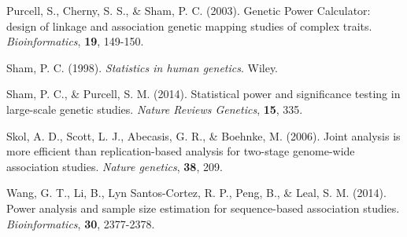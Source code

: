 \documentclass{bioinfo}
\begin{document}
\begin{thebibliography}{}
Purcell, S., Cherny, S. S., \& Sham, P. C. (2003). 
Genetic Power Calculator: design of linkage and association genetic mapping studies of complex traits. 
{\it Bioinformatics}, {\bf 19}, 149-150.

Sham, P. C. (1998). {\it Statistics in human genetics}. Wiley.

Sham, P. C., \& Purcell, S. M. (2014).
Statistical power and significance testing in large-scale genetic studies. 
{\it Nature Reviews Genetics}, {\bf 15}, 335.

Skol, A. D., Scott, L. J., Abecasis, G. R., \& Boehnke, M. (2006). 
Joint analysis is more efficient than replication-based analysis for two-stage genome-wide association studies. 
{\it Nature genetics}, {\bf 38}, 209.

Wang, G. T., Li, B., Lyn Santos-Cortez, R. P., Peng, B., \& Leal, S. M. (2014). 
Power analysis and sample size estimation for sequence-based association studies. 
{\it Bioinformatics}, {\bf 30}, 2377-2378.



\end{thebibliography}
\end{document}
